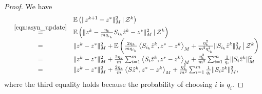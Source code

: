 {\begin{proof}
We have
\begin{equation}\label{eqn:equality_inconsistent}
\begin{array}{rcl}
&&\mathbb{E}\left(\|z^{k+1} - z^*\|_M^2\,|\,\cZ^k\right)\\
&\overset{\eqref{eqn:asyn_update}}=&\mathbb{E}\left(\|z^{k}  -
\textstyle\frac{\eta_k}{mq_{i_k}}S_{i_k} \hat{z}^{k}- z^*
\|_M^2\,|\,\cZ^k\right)\cr &=& \|z^k -
z^*\|_M^2+\mathbb{E}\left(\textstyle\frac{2\eta_k}{mq_{i_k}} \left\langle
S_{i_k} \hat{z}^{k}, z^* - z^k \right\rangle_M +
\textstyle\frac{\eta_k^2}{m^2q_{i_k}^2}
\|S_{i_k}\hat{z}^{k}\|_M^2\,\big|\,\cZ^k\right)\cr &=&\|z^k -
z^*\|_M^2+\textstyle\frac{2\eta_k}{m} \sum_{i=1}^m\left\langle S_i
\hat{z}^{k}, z^* - z^k \right\rangle_M +
\frac{\eta_k^2}{m^2}\sum_{i=1}^m\frac{1}{q_i}\|S_i\hat{z}^{k}\|_M^2\cr &=&\|z^k
- z^*\|_M^2+\textstyle\frac{2\eta_k}{m} \left\langle S \hat{z}^{k}, z^* - z^k
\right\rangle_M +\frac{\eta_k^2}{m^2} \sum_{i=1}^m\frac{1}{q_i}
\|S_i\hat{z}^{k}\|_M^2,
\end{array}
\end{equation}
where the third equality holds because the probability of choosing $i$ is $q_i$.


\end{proof}}
